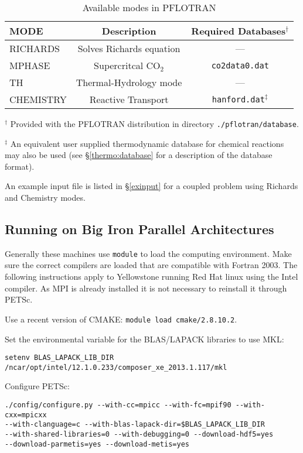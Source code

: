 \begin{table}[H]\centering
\caption{Available modes in PFLOTRAN}
\label{tmodes}
\vspace{3mm}
\begin{tabular}{lcc}
\toprule
MODE & \multicolumn{1}{c}{Description} & Required Databases$^\dag$\\
\midrule
RICHARDS & Solves Richards equation & ---\\
MPHASE & Supercritcal CO$_2$ & {\tt co2data0.dat} \\
TH & Thermal-Hydrology mode & ---\\
CHEMISTRY & Reactive Transport & {\tt hanford.dat}$^\ddag$ \\
\bottomrule
\end{tabular}

\vspace{3mm}

\parbox{4.5in}{
\indent $^\dag$ Provided with the PFLOTRAN distribution in directory {\tt ./pflotran/database}.

\medskip

\indent $^\ddag$ An equivalent user supplied thermodynamic database for chemical reactions may also be used (see \S\ref{thermo:database} for a description of the database format). 
}
\end{table}

An example input file is listed in \S\ref{exinput} for a coupled problem using Richards and Chemistry modes.

\subsection{Running on Big Iron Parallel Architectures}

Generally these machines use {\footnotesize\tt module} to load the computing environment.
Make sure the correct compilers are loaded that are compatible with Fortran 2003. The following instructions apply to Yellowstone running Red Hat linux using the Intel compiler. As MPI is already installed it is not necessary to reinstall it through PETSc.

\noindent
Use a recent version of CMAKE: {\footnotesize\tt module load cmake/2.8.10.2}.

\noindent Set the environmental variable for the BLAS/LAPACK libraries to use MKL:

\noindent
{\footnotesize\tt setenv BLAS\_LAPACK\_LIB\_DIR /ncar/opt/intel/12.1.0.233/composer\_xe\_2013.1.117/mkl}

\noindent
Configure PETSc:
\footnotesize
\begin{Verbatim}
./config/configure.py --with-cc=mpicc --with-fc=mpif90 --with-cxx=mpicxx 
--with-clanguage=c --with-blas-lapack-dir=$BLAS_LAPACK_LIB_DIR 
--with-shared-libraries=0 --with-debugging=0 --download-hdf5=yes 
--download-parmetis=yes --download-metis=yes
\end{Verbatim}
\normalsize


